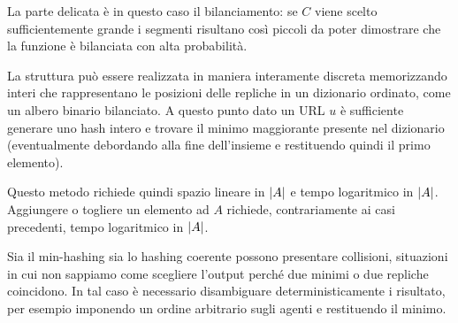 \documentclass[\main/main.tex]{subfiles}
\begin{document}
\begin{multicols}{2}
\begin{definition}
    La parte delicata è in questo caso il bilanciamento: se \(C\) viene scelto sufficientemente grande i segmenti risultano così piccoli da poter dimostrare che la funzione è bilanciata con alta probabilità.
    
    La struttura può essere realizzata in maniera interamente discreta memorizzando interi che rappresentano le posizioni delle repliche in un dizionario ordinato, come un albero binario bilanciato. A questo punto dato un URL \(u\) è sufficiente generare uno hash intero e trovare il minimo maggiorante presente nel dizionario (eventualmente debordando alla fine dell'insieme e restituendo quindi il primo elemento).
    
    Questo metodo richiede quindi spazio lineare in \(\left\lvert A\right\rvert\) e tempo logaritmico in \(\left\lvert A\right\rvert\). Aggiungere o togliere un elemento ad \(A\) richiede, contrariamente ai casi precedenti, tempo logaritmico in \(\left\lvert A\right\rvert\).
\end{definition}
\begin{definition}[Collisioni]
    Sia il min-hashing sia lo hashing coerente possono presentare collisioni, situazioni in cui non sappiamo come scegliere l'output perché due minimi o due repliche coincidono. In tal caso è necessario disambiguare deterministicamente i risultato, per esempio imponendo un ordine arbitrario sugli agenti e restituendo il minimo.
\end{definition}
\end{multicols}
\end{document}
